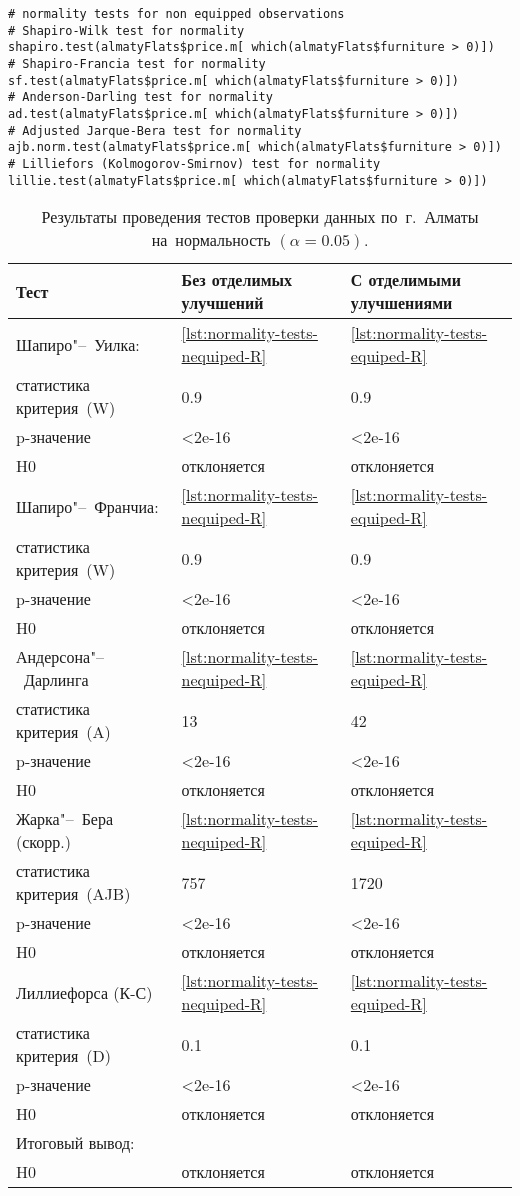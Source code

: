 \documentclass[]{scrreprt}
\begin{document}
%
\begin{lstlisting}[float, caption = Проведение тестов на~нормальность для~наблюдений с~отделимыми улучшениями, firstnumber=1, label= lst:normality-tests-equiped-R]
# normality tests for non equipped observations
# Shapiro-Wilk test for normality
shapiro.test(almatyFlats$price.m[ which(almatyFlats$furniture > 0)])
# Shapiro-Francia test for normality
sf.test(almatyFlats$price.m[ which(almatyFlats$furniture > 0)])
# Anderson-Darling test for normality
ad.test(almatyFlats$price.m[ which(almatyFlats$furniture > 0)])
# Adjusted Jarque-Bera test for normality
ajb.norm.test(almatyFlats$price.m[ which(almatyFlats$furniture > 0)])
# Lilliefors (Kolmogorov-Smirnov) test for normality
lillie.test(almatyFlats$price.m[ which(almatyFlats$furniture > 0)])
\end{lstlisting}
%

\begin{table}[ht]
	\caption{Результаты проведения тестов проверки данных по~г.~Алматы на~нормальность $({\textstyle \alpha=0.05})$.}\label{tab:normality-tests-values-R}
	\centering
	\begin{tabular}{lll}
		\hline
		Тест&Без отделимых улучшений&С отделимыми улучшениями\\
		\hline
		Шапиро"--~Уилка:&\ref{lst:normality-tests-nequiped-R}&\ref{lst:normality-tests-equiped-R}\\
		статистика критерия~(W)&0.9&0.9\\
		p-значение&<2e-16&<2e-16\\
		H0&отклоняется&отклоняется\\
		\hline
		Шапиро"--~Франчиа:&\ref{lst:normality-tests-nequiped-R}&\ref{lst:normality-tests-equiped-R}\\
		статистика критерия~(W)&0.9&0.9\\
		p-значение&<2e-16&<2e-16\\
		H0&отклоняется&отклоняется\\
		\hline
		Андерсона"--~Дарлинга&\ref{lst:normality-tests-nequiped-R}&\ref{lst:normality-tests-equiped-R}\\
		статистика критерия~(A)&13&42\\
		p-значение&<2e-16&<2e-16\\
		H0&отклоняется&отклоняется\\
		\hline
		Жарка"--~Бера (скорр.)&\ref{lst:normality-tests-nequiped-R}&\ref{lst:normality-tests-equiped-R}\\
		статистика критерия~(AJB)&757&1720\\
		p-значение&<2e-16&<2e-16\\
		H0&отклоняется&отклоняется\\
		\hline
		Лиллиефорса (К-С)&\ref{lst:normality-tests-nequiped-R}&\ref{lst:normality-tests-equiped-R}\\
		статистика критерия~(D)&0.1&0.1\\
		p-значение&<2e-16&<2e-16\\
		H0&отклоняется&отклоняется\\
		\hline
		Итоговый вывод:&&\\
		H0&отклоняется&отклоняется\\
		\hline
	\end{tabular}
\end{table}
\end{document}
